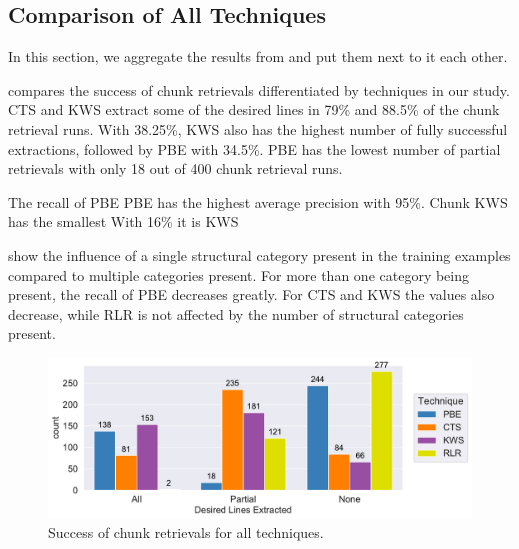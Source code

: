 \subsection{Comparison of All Techniques}
In this section, we aggregate the results from
 and put them next to it
each other.

 compares the success of chunk
retrievals differentiated by techniques in our study.
CTS and KWS
extract some of the desired lines in 79\% and 88.5\% of the chunk
retrieval runs.
With 38.25\%, KWS also has the highest number of fully
successful extractions, followed by PBE with 34.5\%.
PBE has the
lowest number of partial retrievals with only 18 out of 400 chunk
retrieval runs.

The recall of PBE
PBE has the highest average precision with 95\%.
Chunk
KWS has the smallest
With 16\% it is
KWS

show the influence of a single structural category present in the
training examples compared to multiple categories present.
For more
than one category being present, the recall of PBE decreases greatly.
For CTS and KWS the values also decrease, while RLR is not affected by
the number of structural categories present.

\begin{figure}[!t]
		\centering
		\includegraphics[width=\columnwidth,
		clip]{img/big-study/success-partial-all.pdf}
		\caption{Success of chunk retrievals for all techniques.}
		\label{fig:success-partial-all}
\end{figure}

